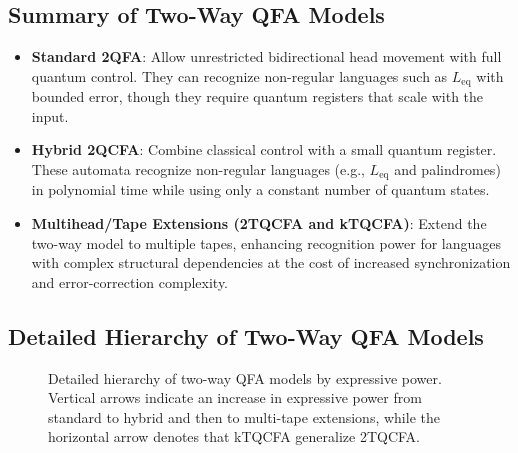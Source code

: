 \subsection*{Summary of Two-Way QFA Models}
\begin{itemize}
    \item \textbf{Standard 2QFA}: Allow unrestricted bidirectional head movement with full quantum control. They can recognize non-regular languages such as \( L_{\text{eq}} \) with bounded error, though they require quantum registers that scale with the input.
    \item \textbf{Hybrid 2QCFA}: Combine classical control with a small quantum register. These automata recognize non-regular languages (e.g., \( L_{\text{eq}} \) and palindromes) in polynomial time while using only a constant number of quantum states.
    \item \textbf{Multihead/Tape Extensions (2TQCFA and kTQCFA)}: Extend the two-way model to multiple tapes, enhancing recognition power for languages with complex structural dependencies at the cost of increased synchronization and error-correction complexity.
\end{itemize}

\subsection*{Detailed Hierarchy of Two-Way QFA Models}
\label{subsec:two-way-hierarchy}

\begin{figure}[ht]
\centering
{}
\caption{Detailed hierarchy of two-way QFA models by expressive power. Vertical arrows indicate an increase in expressive power from standard to hybrid and then to multi-tape extensions, while the horizontal arrow denotes that kTQCFA generalize 2TQCFA.}
\label{fig:two-way-detailed-hierarchy}
\end{figure}

